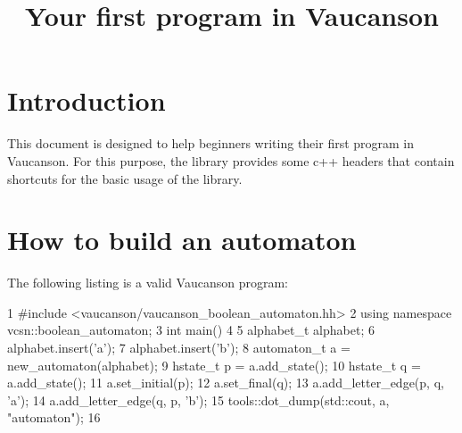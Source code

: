 \documentclass{article}
\begin{document}
\title{Your first program in Vaucanson}

\maketitle
\tableofcontents

\section{Introduction}

This document is designed to help beginners writing their first
program in Vaucanson. For this purpose, the library provides some c++
headers that contain shortcuts for the basic usage of the library.

\section{How to build an automaton}

The following listing is a valid Vaucanson program:

\begin{code}
1  #include <vaucanson/vaucanson_boolean_automaton.hh>
2  using namespace vcsn::boolean_automaton;
3  int main()
4  {
5    alphabet_t alphabet;
6    alphabet.insert('a');
7    alphabet.insert('b');
8    automaton_t a = new_automaton(alphabet);
9    hstate_t p = a.add_state();
10   hstate_t q = a.add_state();
11   a.set_initial(p);
12   a.set_final(q);
13   a.add_letter_edge(p, q, 'a');
14   a.add_letter_edge(q, p, 'b');
15   tools::dot_dump(std::cout, a, "automaton");
16 }
\end{code}
\end{document}
